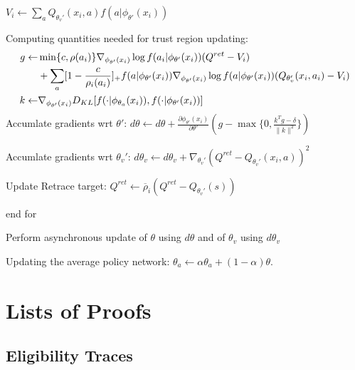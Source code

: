 \documentclass[11pt,a4paper]{article}
\def\bar{\overline}
\begin{document}
\begin{tcolorbox}[title=ACER for discrete actions]
\hspace{1cm} $V_i \leftarrow \sum_a Q_{\theta_v'}(x_i,a)f(a|\phi_{\theta'}(x_i))$\par 
\hspace{1cm} Computing quantities needed for trust region updating:
\begin{equation}
\aligned 
    g \leftarrow & \min\{c, \rho(a_i)\}\nabla_{\phi_{\theta'}(x_i)} \log f(a_i|\phi_{\theta'}(x_i))(Q^{ret}-V_i) \\
    & + \sum_a [1-\frac{c}{\rho_i(a_i)}]_+ f(a|\phi_{\theta'}(x_i))\nabla_{\phi_{\theta'}(x_i)}\log f(a|\phi_{\theta'}(x_i))(Q_{\theta_v'}(x_i,a_i)-V_i) \\ 
    k \leftarrow & \nabla_{\phi_{\theta'}(x_i)} D_{KL}[f(\cdot|\phi_{\theta_a}(x_i)), f(\cdot|\phi_{\theta'}(x_i))] \\
\endaligned
\end{equation}
\hspace{1cm} Accumlate gradients wrt $\theta'$: $d\theta \leftarrow d\theta + \frac{\partial\phi_{\theta'}(x_i)}{\partial \theta'}(g-\max\{0,\frac{k^Tg -\delta}{\|k\|^2}\})$ \par 
\hspace{1cm} Accumlate gradients wrt $\theta_v'$: $d\theta_v \leftarrow d\theta_v + \nabla_{\theta_v'}(Q^{ret}-Q_{\theta_v'}(x_i,a))^2$ \par 
\hspace{1cm} Update Retrace target: $Q^{ret} \leftarrow \bar{\rho}_i(Q^{ret}-Q_{\theta_v'}(s))$ \par 
end for \par 
Perform asynchronous update of $\theta$ using $d\theta$ and of $\theta_v$ using $d\theta_v$ \par 
Updating the average policy network: $\theta_a \leftarrow \alpha \theta_a + (1-\alpha) \theta$.

\end{tcolorbox}










\clearpage




\appendix
\section{Lists of Proofs}
\subsection{Eligibility Traces}
\end{document}
